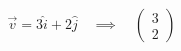 \documentclass[preview]{standalone}
\begin{document}
\begin{align*}
\vec{v} = 3\hat{i} + 2\hat{j} \quad \implies \quad \begin{pmatrix} 3 \\ 2 \end{pmatrix}
\end{align*}
\end{document}
